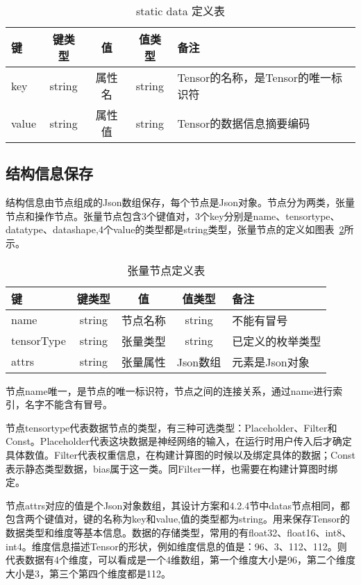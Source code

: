 \begin{table}[htb]
  \centering\small
  \caption{static data 定义表}
  \label{tab:data-tab}
  \begin{tabular}{lcccl}
    \toprule
    键        & 键类型    & 值    & 值类型     &备注                    \\
    \midrule
    key   & string  & 属性名 &string  & Tensor的名称，是Tensor的唯一标识符\\
    value & string  & 属性值 &string & Tensor的数据信息摘要编码 \\
    \bottomrule
  \end{tabular}
\end{table}

\subsection {结构信息保存}
结构信息由节点组成的Json数组保存，每个节点是Json对象。节点分为两类，张量节点和操作节点。张量节点包含3个键值对，3个key分别是name、tensortype、datatype、datashape,4个value的类型都是string类型，张量节点的定义如图表~\ref{tab:struct-tab}所示。

\begin{table}[htb]
  \centering\small
  \caption{张量节点定义表}
  \label{tab:struct-tab}
  \begin{tabular}{lcccl}
    \toprule
    键        & 键类型    & 值    & 值类型     &备注       \\
    \midrule
    name   & string  & 节点名称 &string  & 不能有冒号\\
    tensorType & string  & 张量类型 &string & 已定义的枚举类型 \\
    attrs & string  & 张量属性 & Json数组 & 元素是Json对象 \\
    \bottomrule
  \end{tabular}
\end{table}

节点name唯一，是节点的唯一标识符，节点之间的连接关系，通过name进行索引，名字不能含有冒号。

节点tensortype代表数据节点的类型，有三种可选类型：Placeholder、Filter和Const。Placeholder代表这块数据是神经网络的输入，在运行时用户传入后才确定具体数值。Filter代表权重信息，在构建计算图的时候以及绑定具体的数据；Const表示静态类型数据，bias属于这一类。同Filter一样，也需要在构建计算图时绑定。

节点attrs对应的值是个Json对象数组，其设计方案和4.2.4节中datas节点相同，都包含两个键值对，键的名称为key和value,值的类型都为string。用来保存Tensor的数据类型和维度等基本信息。数据的存储类型，常用的有float32、float16、int8、int4。维度信息描述Tensor的形状，例如维度信息的值是：96、3、112、112。则代表数据有4个维度，可以看成是一个4维数组，第一个维度大小是96，第二个维度大小是3，第三个第四个维度都是112。

